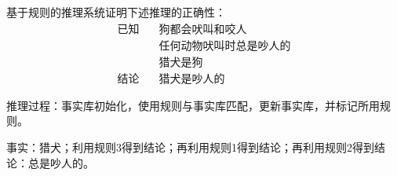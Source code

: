 \begin{question}
基于规则的推理系统证明下述推理的正确性： 
	\begin{align*}
	\text{已知} \quad	& \text{狗都会吠叫和咬人} \\
					& \text{任何动物吠叫时总是吵人的} \\
					& \text{猎犬是狗} \\
	\text{结论} \quad	& \text{猎犬是吵人的}
	\end{align*}
\end{question}
\begin{solution}
推理过程：事实库初始化，使用规则与事实库匹配，更新事实库，并标记所用规则。\par
事实：猎犬；利用规则3得到结论；再利用规则1得到结论；再利用规则2得到结论：总是吵人的。
\end{solution}